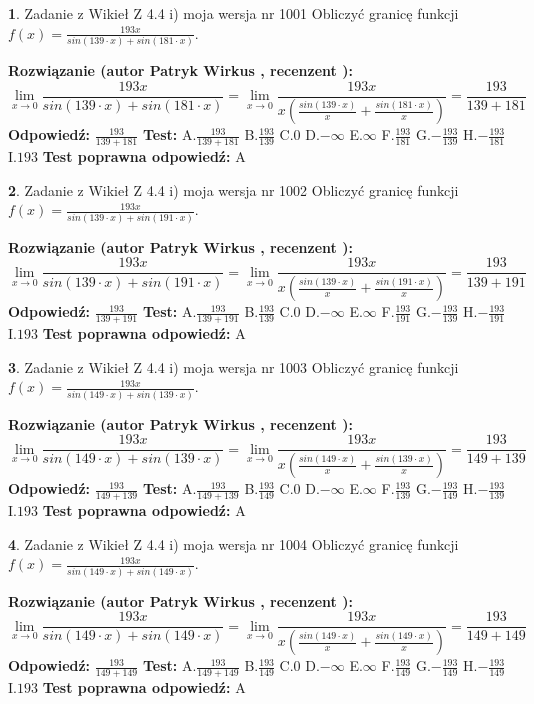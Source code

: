 \documentclass[12pt, a4paper]{article}
\theoremstyle{definition} %
\newtheorem{zad}{}
\newcommand{\zadStart}[1]{\begin{zad}#1\newline}
\newcommand{\zadStop}{\end{zad}}
\newcommand{\rozwStart}[2]{\noindent \textbf{Rozwiązanie (autor #1 , recenzent #2): }\newline}
\newcommand{\rozwStop}{\newline}
\newcommand{\odpStart}{\noindent \textbf{Odpowiedź:}\newline}
\newcommand{\odpStop}{\newline}
\newcommand{\testStart}{\noindent \textbf{Test:}\newline}
\newcommand{\testStop}{\newline}
\newcommand{\kluczStart}{\noindent \textbf{Test poprawna odpowiedź:}\newline}
\newcommand{\kluczStop}{\newline}
\begin{document}
\zadStart{Zadanie z Wikieł Z 4.4 i) moja wersja nr 1001}
Obliczyć granicę funkcji $f(x)=\frac{193x}{sin(139\cdot x) +sin(181\cdot x)}$.
\zadStop
\rozwStart{Patryk Wirkus}{}
$$\lim\limits_{x\to 0}\frac{193x}{sin(139\cdot x) +sin(181\cdot x)}=\lim\limits_{x\to 0}\frac{193x}{x(\frac{sin(139\cdot x)}{x}+\frac{sin(181\cdot x)}{x})}=\frac{193}{139+181}$$
\rozwStop
\odpStart
$\frac{193}{139+181}$
\odpStop
\testStart
A.$\frac{193}{139+181}$
B.$\frac{193}{139}$
C.$0$
D.$-\infty$
E.$\infty$
F.$\frac{193}{181}$
G.$-\frac{193}{139}$
H.$-\frac{193}{181}$
I.$193$
\testStop
\kluczStart
A
\kluczStop



\zadStart{Zadanie z Wikieł Z 4.4 i) moja wersja nr 1002}
Obliczyć granicę funkcji $f(x)=\frac{193x}{sin(139\cdot x) +sin(191\cdot x)}$.
\zadStop
\rozwStart{Patryk Wirkus}{}
$$\lim\limits_{x\to 0}\frac{193x}{sin(139\cdot x) +sin(191\cdot x)}=\lim\limits_{x\to 0}\frac{193x}{x(\frac{sin(139\cdot x)}{x}+\frac{sin(191\cdot x)}{x})}=\frac{193}{139+191}$$
\rozwStop
\odpStart
$\frac{193}{139+191}$
\odpStop
\testStart
A.$\frac{193}{139+191}$
B.$\frac{193}{139}$
C.$0$
D.$-\infty$
E.$\infty$
F.$\frac{193}{191}$
G.$-\frac{193}{139}$
H.$-\frac{193}{191}$
I.$193$
\testStop
\kluczStart
A
\kluczStop



\zadStart{Zadanie z Wikieł Z 4.4 i) moja wersja nr 1003}
Obliczyć granicę funkcji $f(x)=\frac{193x}{sin(149\cdot x) +sin(139\cdot x)}$.
\zadStop
\rozwStart{Patryk Wirkus}{}
$$\lim\limits_{x\to 0}\frac{193x}{sin(149\cdot x) +sin(139\cdot x)}=\lim\limits_{x\to 0}\frac{193x}{x(\frac{sin(149\cdot x)}{x}+\frac{sin(139\cdot x)}{x})}=\frac{193}{149+139}$$
\rozwStop
\odpStart
$\frac{193}{149+139}$
\odpStop
\testStart
A.$\frac{193}{149+139}$
B.$\frac{193}{149}$
C.$0$
D.$-\infty$
E.$\infty$
F.$\frac{193}{139}$
G.$-\frac{193}{149}$
H.$-\frac{193}{139}$
I.$193$
\testStop
\kluczStart
A
\kluczStop



\zadStart{Zadanie z Wikieł Z 4.4 i) moja wersja nr 1004}
Obliczyć granicę funkcji $f(x)=\frac{193x}{sin(149\cdot x) +sin(149\cdot x)}$.
\zadStop
\rozwStart{Patryk Wirkus}{}
$$\lim\limits_{x\to 0}\frac{193x}{sin(149\cdot x) +sin(149\cdot x)}=\lim\limits_{x\to 0}\frac{193x}{x(\frac{sin(149\cdot x)}{x}+\frac{sin(149\cdot x)}{x})}=\frac{193}{149+149}$$
\rozwStop
\odpStart
$\frac{193}{149+149}$
\odpStop
\testStart
A.$\frac{193}{149+149}$
B.$\frac{193}{149}$
C.$0$
D.$-\infty$
E.$\infty$
F.$\frac{193}{149}$
G.$-\frac{193}{149}$
H.$-\frac{193}{149}$
I.$193$
\testStop
\kluczStart
A
\kluczStop
\end{document}
